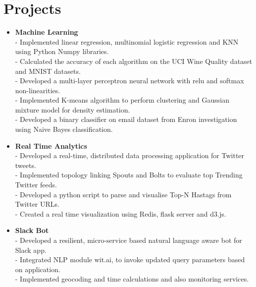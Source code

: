 \section {Projects}
\begin{itemize}


 \item \textbf{Machine Learning} \\
 - Implemented linear regression, multinomial logistic regression and KNN using Python Numpy libraries. \\
 - Calculated the accuracy of each algorithm on the UCI Wine Quality dataset and MNIST datasets.\\
 - Developed a multi-layer perceptron neural network with relu and softmax non-linearities. \\
 - Implemented K-means algorithm to perform clustering and Gaussian mixture model for density estimation.\\
 - Developed a binary classifier on email dataset from Enron investigation using Naive Bayes classification.

\item \textbf{Real Time Analytics} \\
 - Developed a real-time, distributed data processing application for Twitter tweets.\\
 - Implemented topology linking Spouts and Bolts to evaluate top Trending Twitter feeds. \\
 - Developed a python script to parse and visualise Top-N Hastags from Twitter URLs.\\
 - Created a real time visualization using Redis, flask server and d3.js.
 
 \item \textbf{Slack Bot} \\
 - Developed a resilient, micro-service based natural language aware bot for Slack app.\\
 - Integrated NLP module wit.ai, to invoke updated query parameters based on application.\\
 - Implemented geocoding and time calculations and also monitoring services. 



\end{itemize}
